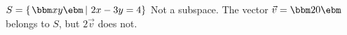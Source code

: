 {$S = \left\{\left. \bbm x\\y \ebm \, \right| \, 2x-3y=4\right\}$}
{Not a subspace. The vector $\vec v = \bbm 2\\0\ebm$ belongs to $S$, but $2\vec v$ does not.}